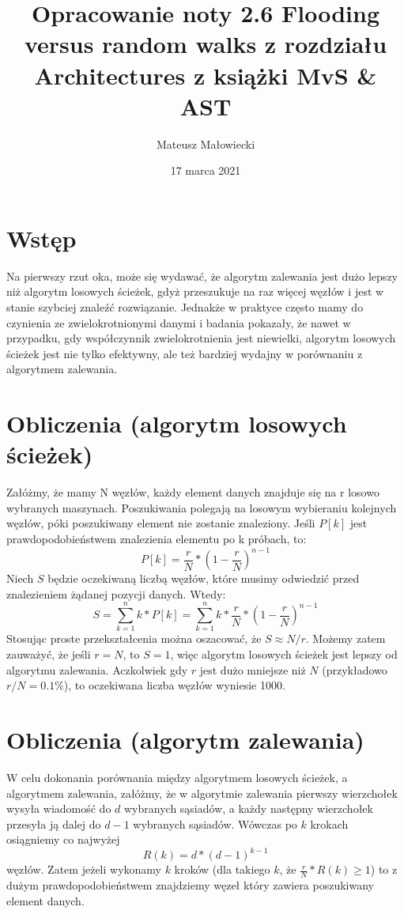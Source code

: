 \documentclass[10pt, a4paper]{article}
\author{Mateusz Małowiecki}
\title{Opracowanie noty 2.6 Flooding versus random walks​ z rozdziału Architectures z książki MvS \& AST}
\date{17 marca 2021}
\begin{document}
\section*{Wstęp}
Na pierwszy rzut oka, może się wydawać, że algorytm zalewania jest dużo lepszy niż algorytm losowych ścieżek, gdyż przeszukuje na raz więcej węzłów i jest w stanie szybciej znaleźć rozwiązanie. Jednakże w praktyce często mamy do czynienia ze zwielokrotnionymi danymi i badania pokazały, że nawet w przypadku, gdy współczynnik zwielokrotnienia jest niewielki, algorytm losowych ścieżek jest nie tylko efektywny, ale też bardziej wydajny w porównaniu z algorytmem zalewania​.
\section*{Obliczenia (algorytm losowych ścieżek)}
Załóżmy, że mamy N węzłów, każdy element danych znajduje się na r losowo wybranych maszynach. Poszukiwania polegają na losowym wybieraniu kolejnych węzłów, póki poszukiwany element nie zostanie znaleziony. Jeśli $P[k]$ jest prawdopodobieństwem znalezienia elementu po k próbach, to:​
\begin{equation}
P[k] = \frac{r}{N}*(1-\frac{r}{N})^{n-1}
\end{equation}
Niech $S$ będzie oczekiwaną liczbą węzłów, które musimy
odwiedzić przed znalezieniem żądanej pozycji danych. Wtedy:
\begin{equation}
S = \sum_{k=1}^{n} k * P[k] = \sum_{k=1}^{n} k *\frac{r}{N}*(1-\frac{r}{N})^{n-1}
\end{equation}
Stosując proste przekształcenia można oszacować, że $S \approx N/r $. Możemy zatem zauważyć, że jeśli $r = N$, to $S=1$, więc algorytm losowych ścieżek jest lepszy od algorytmu zalewania. Aczkolwiek gdy $r$ jest dużo mniejsze niż $N$ (przykładowo $r/N = 0.1\% $), to oczekiwana liczba węzłów wyniesie 1000.
\section*{Obliczenia (algorytm zalewania)}
W celu dokonania porównania między algorytmem losowych ścieżek, a algorytmem zalewania, załóżmy, że w algorytmie zalewania pierwszy wierzchołek wysyła wiadomość do $d$ wybranych sąsiadów, a każdy następny wierzchołek przesyła ją dalej do $d-1$ wybranych sąsiadów. Wówczas po $k$ krokach osiągniemy co najwyżej
\begin{equation}
R(k) = d*(d − 1)^{k − 1}
\end{equation}
węzłów. Zatem jeżeli wykonamy $k$ kroków (dla takiego $k$, że $\frac{r}{N}*R(k) \geq 1 $) to z dużym prawdopodobieństwem znajdziemy węzeł który zawiera poszukiwany element danych.
\end{document}
